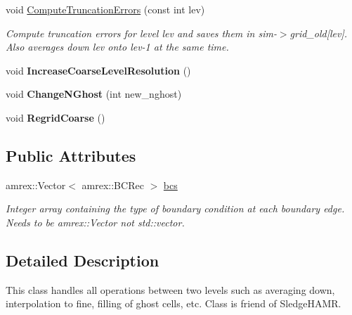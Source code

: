 \begin{DoxyCompactItemize}
void \mbox{\hyperlink{classsledgehamr_1_1LevelSynchronizer_a4798ce7632bccf7ad0f85818821510e5}{Compute\+Truncation\+Errors}} (const int lev)
\begin{DoxyCompactList}\small\item\em Compute truncation errors for level lev and saves them in sim-\/$>$grid\+\_\+old\mbox{[}lev\mbox{]}. Also averages down lev onto lev-\/1 at the same time. \end{DoxyCompactList}\item 
\mbox{\label{classsledgehamr_1_1LevelSynchronizer_a5aa6cfaef9320be425e5a277e8b53347}} 
void {\bfseries Increase\+Coarse\+Level\+Resolution} ()
\item 
\mbox{\label{classsledgehamr_1_1LevelSynchronizer_aeb187b4ec4d11418262719b8b795920b}} 
void {\bfseries Change\+N\+Ghost} (int new\+\_\+nghost)
\item 
\mbox{\label{classsledgehamr_1_1LevelSynchronizer_a1fa60835bbe73c27b23c24227921515c}} 
void {\bfseries Regrid\+Coarse} ()
\end{DoxyCompactItemize}
\subsection*{Public Attributes}
\begin{DoxyCompactItemize}
\item 
\mbox{\label{classsledgehamr_1_1LevelSynchronizer_ae842540f1dba4f74c6ab6444fc7838d7}} 
amrex\+::\+Vector$<$ amrex\+::\+B\+C\+Rec $>$ \mbox{\hyperlink{classsledgehamr_1_1LevelSynchronizer_ae842540f1dba4f74c6ab6444fc7838d7}{bcs}}
\begin{DoxyCompactList}\small\item\em Integer array containing the type of boundary condition at each boundary edge. Needs to be amrex\+::\+Vector not std\+::vector. \end{DoxyCompactList}\end{DoxyCompactItemize}


\subsection{Detailed Description}
This class handles all operations between two levels such as averaging down, interpolation to fine, filling of ghost cells, etc. Class is friend of Sledge\+H\+A\+MR. 

